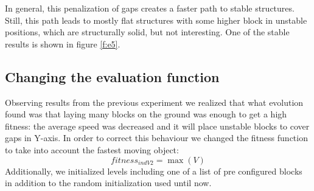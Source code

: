 \documentclass[runningheads,a4paper]{llncs}
\begin{document}
 In general, this penalization of gaps creates a faster path to stable
 structures. Still, this path leads to mostly flat structures with 
 some higher block in unstable positions, which
 are structurally solid, but not interesting. One of the stable results is shown in figure \ref{f:e5}.
 \begin{figure}
 	\centering
 	\hfill
 \end{figure}
\subsection{Changing the evaluation function}\label{E6}

Observing results from the previous experiment we realized that what
evolution found was that laying many blocks on the ground was enough
to get a high fitness: the average speed was decreased and it will
place unstable blocks to cover gaps in Y-axis. In
order to correct this behaviour we changed the 
fitness function to take into account the fastest moving object:
$$fitness_{indV2} = \max{(V)}$$
Additionally, we initialized levels including one of a list of pre configured
blocks in addition to the random initialization used until
now.
\end{document}
